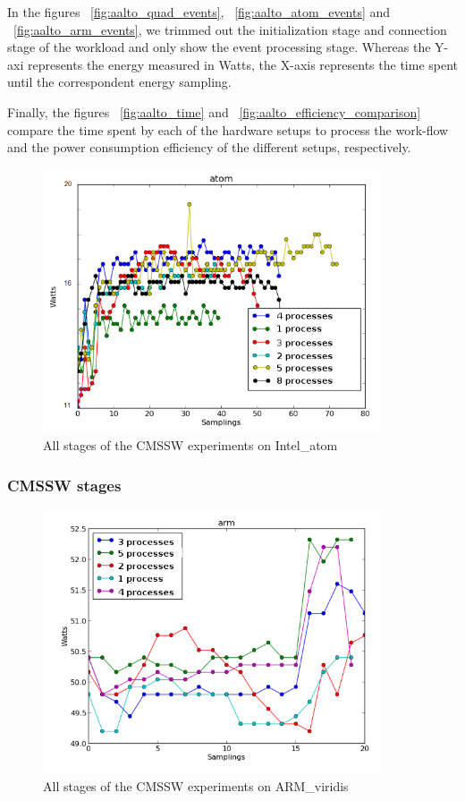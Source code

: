 In the figures ~\ref{fig:aalto_quad_events}, ~\ref{fig:aalto_atom_events} and ~\ref{fig:aalto_arm_events}, we trimmed out the initialization stage and connection stage of the workload and only show the event processing stage. Whereas the Y-axi represents the energy measured in Watts, the X-axis represents the time spent until the correspondent energy sampling.

Finally, the figures ~\ref{fig:aalto_time} and ~\ref{fig:aalto_efficiency_comparison} compare the time spent by each of the hardware setups to process the work-flow and the power consumption efficiency of the different setups, respectively.

\begin{figure}[h]
  \centering
    \includegraphics[width=100mm]{"img/aalto/aalto_total_atom"}
    \caption{All stages of the CMSSW experiments on Intel\_atom}
    \label{fig:aalto_atom_clamp}
\end{figure}



\subsubsection*{CMSSW stages}

\begin{figure}[h]
  \centering
    \includegraphics[width=100mm]{"img/aalto/aalto_total_arm"}
    \caption{All stages of the CMSSW experiments on ARM\_viridis}
    \label{fig:aalto_arm_clamp}
\end{figure}

